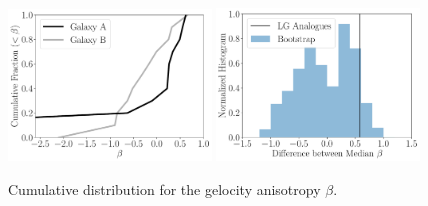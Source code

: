 \documentclass[a4paper,fleqn,usenatbib]{mnras}
\begin{document}
\begin{figure}
\centering
\includegraphics[width=0.48\textwidth]{beta.pdf}
\includegraphics[width=0.48\textwidth]{beta_bootstrap.pdf}
\caption{
Cumulative distribution for the gelocity anisotropy $\beta$.
\label{fig:beta}}
\end{figure}









\end{document}
